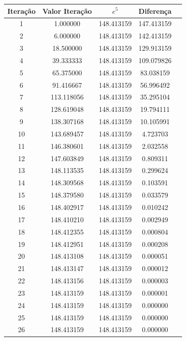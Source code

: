 \documentclass[a4paper]{article}
\begin{document}
\begin{table}[H]
	\centering
	\begin{tabular}{|c|c|c|c|c|}
    	\hline
		Iteração & Valor Iteração & $e^5$ & Diferença \\
		\hline
		1 & 1.000000 & 148.413159 & 147.413159\\
		\hline
		2 & 6.000000 & 148.413159 & 142.413159\\
		\hline
		3 & 18.500000 & 148.413159 & 129.913159\\
		\hline
		4 & 39.333333 & 148.413159 & 109.079826\\
		\hline
		5 & 65.375000 & 148.413159 & 83.038159\\
		\hline
		6 & 91.416667 & 148.413159 & 56.996492\\
		\hline
		7 & 113.118056 & 148.413159 & 35.295104\\
		\hline
		8 & 128.619048 & 148.413159 & 19.794111\\
		\hline
		9 & 138.307168 & 148.413159 & 10.105991\\
		\hline
		10 & 143.689457 & 148.413159 & 4.723703\\
		\hline
		11 & 146.380601 & 148.413159 & 2.032558\\
		\hline
		12 & 147.603849 & 148.413159 & 0.809311\\
		\hline
		13 & 148.113535 & 148.413159 & 0.299624\\
		\hline
		14 & 148.309568 & 148.413159 & 0.103591\\
		\hline
		15 & 148.379580 & 148.413159 & 0.033579\\
		\hline
		16 & 148.402917 & 148.413159 & 0.010242\\
		\hline
		17 & 148.410210 & 148.413159 & 0.002949\\
		\hline
		18 & 148.412355 & 148.413159 & 0.000804\\
		\hline
		19 & 148.412951 & 148.413159 & 0.000208\\
		\hline
		20 & 148.413108 & 148.413159 & 0.000051\\
		\hline
		21 & 148.413147 & 148.413159 & 0.000012\\
		\hline
		22 & 148.413156 & 148.413159 & 0.000003\\
		\hline
		23 & 148.413159 & 148.413159 & 0.000001\\
		\hline
		24 & 148.413159 & 148.413159 & 0.000000\\
		\hline
		25 & 148.413159 & 148.413159 & 0.000000\\
		\hline
		26 & 148.413159 & 148.413159 & 0.000000\\

\end{tabular}
\end{table}
\end{document}
